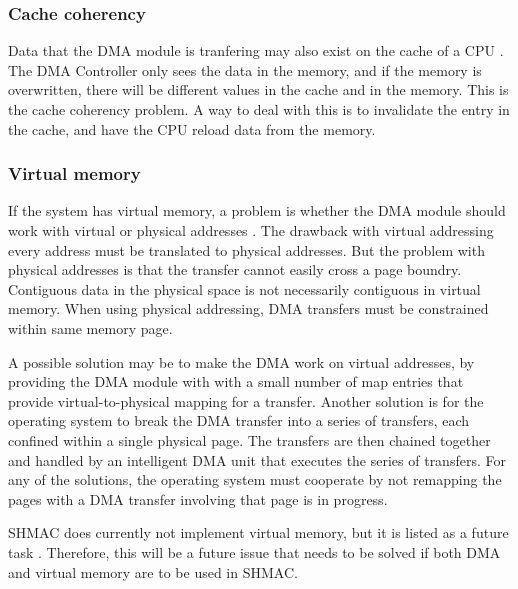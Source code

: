 \subsubsection{Cache coherency}
Data that the DMA module is tranfering may also exist on the cache of a CPU \cite[p~594-595]{computer-construction}.
The DMA Controller only sees the data in the memory, and if the memory is overwritten, there will be different values in the cache and in the memory.
This is the cache coherency problem.
A way to deal with this is to invalidate the entry in the cache, and have the CPU reload data from the memory.

\subsubsection{Virtual memory}
If the system has virtual memory, a problem is whether the DMA module should work with virtual or physical addresses \cite[p~595]{computer-construction}.
The drawback with virtual addressing every address must be translated to physical addresses.
But the problem with physical addresses is that the transfer cannot easily cross a page boundry.
Contiguous data in the physical space is not necessarily contiguous in virtual memory.
When using physical addressing, DMA transfers must be constrained within same memory page.

A possible solution may be to make the DMA work on virtual addresses, by providing the DMA module with with a small number of map entries that provide virtual-to-physical mapping for a transfer.
Another solution is for the operating system to break the DMA transfer into a series of transfers, each confined within a single physical page.
The transfers are then chained together and handled by an intelligent DMA unit that executes the series of transfers. 
For any of the solutions, the operating system must cooperate by not remapping the pages with a DMA transfer involving that page is in progress.

SHMAC does currently not implement virtual memory, but it is listed as a future task \cite[p~10]{shmac-plan}.
Therefore, this will be a future issue that needs to be solved if both DMA and virtual memory are to be used in SHMAC. 

